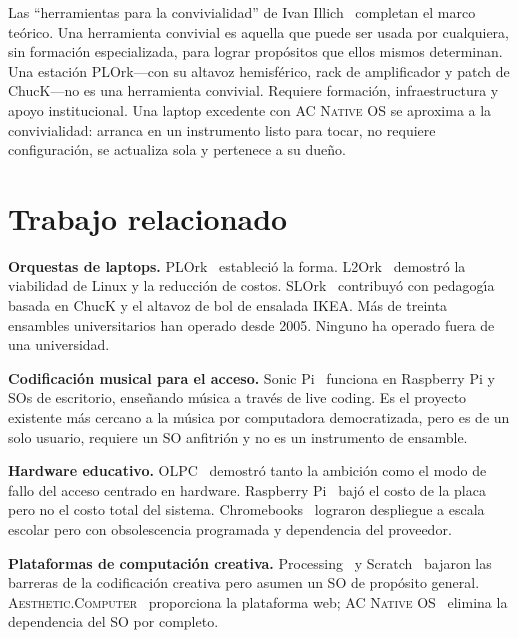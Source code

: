 \documentclass[10pt,letterpaper,twocolumn]{article}
\newcommand{\ac}{\textsc{Aesthetic.Computer}}
\newcommand{\acos}{\textsc{AC Native OS}}
\begin{document}
Las ``herramientas para la convivialidad'' de Ivan Illich~\citep{illich1973tools} completan el marco te\'{o}rico. Una herramienta convivial es aquella que puede ser usada por cualquiera, sin formaci\'{o}n especializada, para lograr prop\'{o}sitos que ellos mismos determinan. Una estaci\'{o}n PLOrk---con su altavoz hemisf\'{e}rico, rack de amplificador y patch de ChucK---no es una herramienta convivial. Requiere formaci\'{o}n, infraestructura y apoyo institucional. Una laptop excedente con \acos{} se aproxima a la convivialidad: arranca en un instrumento listo para tocar, no requiere configuraci\'{o}n, se actualiza sola y pertenece a su due\~{n}o.


\section{Trabajo relacionado}
\label{sec:related}

\textbf{Orquestas de laptops.} PLOrk~\citep{trueman2006plork} estableci\'{o} la forma. L2Ork~\citep{bukvic2010l2ork} demostr\'{o} la viabilidad de Linux y la reducci\'{o}n de costos. SLOrk~\citep{wang2009designing} contribuy\'{o} con pedagog\'{\i}a basada en ChucK y el altavoz de bol de ensalada IKEA. M\'{a}s de treinta ensambles universitarios han operado desde 2005. Ninguno ha operado fuera de una universidad.

\textbf{Codificaci\'{o}n musical para el acceso.} Sonic Pi~\citep{aaron2016sonic} funciona en Raspberry Pi y SOs de escritorio, ense\~{n}ando m\'{u}sica a trav\'{e}s de live coding. Es el proyecto existente m\'{a}s cercano a la m\'{u}sica por computadora democratizada, pero es de un solo usuario, requiere un SO anfitri\'{o}n y no es un instrumento de ensamble.

\textbf{Hardware educativo.} OLPC~\citep{negroponte1995being, kraemer2009olpc} demostr\'{o} tanto la ambici\'{o}n como el modo de fallo del acceso centrado en hardware. Raspberry Pi~\citep{raspberry2012} baj\'{o} el costo de la placa pero no el costo total del sistema. Chromebooks~\citep{pirg2023chromebook} lograron despliegue a escala escolar pero con obsolescencia programada y dependencia del proveedor.

\textbf{Plataformas de computaci\'{o}n creativa.} Processing~\citep{reas2007processing} y Scratch~\citep{resnick2009scratch} bajaron las barreras de la codificaci\'{o}n creativa pero asumen un SO de prop\'{o}sito general. \ac{}~\citep{scudder2026ac} proporciona la plataforma web; \acos{}~\citep{scudder2026os} elimina la dependencia del SO por completo.
\end{document}
